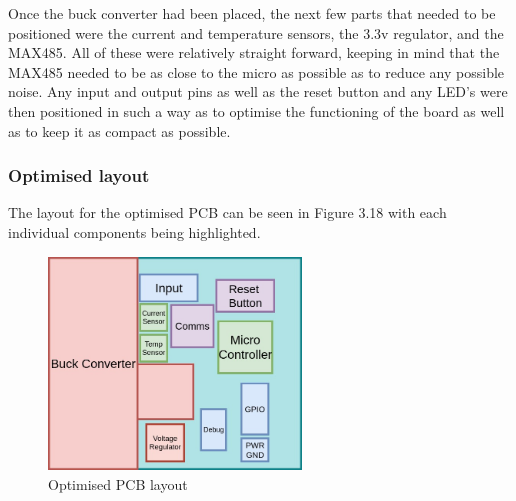 Once the buck converter had been placed, the next few parts that needed to be positioned were the current and temperature sensors, the 3.3v regulator, and the MAX485. All of these were relatively straight forward, keeping in mind that the MAX485 needed to be as close to the micro as possible as to reduce any possible noise. Any input and output pins as well as the reset button and any LED's were then positioned in such a way as to optimise the functioning of the board as well as to keep it as compact as possible.

\vspace{-5mm}
\subsubsection{Optimised layout}    
\vspace{-5mm}
The layout for the optimised PCB can be seen in Figure 3.18 with each individual components being highlighted.
\begin{figure}[H]
\centering
\includegraphics[width=0.6\textwidth]{PCB_breakdown.jpg}
\caption{Optimised PCB layout}
\end{figure} 
\vspace{-5mm}

